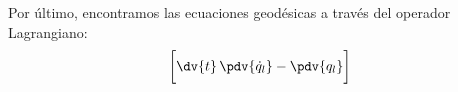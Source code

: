 Por último, encontramos las ecuaciones geodésicas a través del operador Lagrangiano:
\begin{align*}
\bigg[ \dv{t} \, \pdv{\dot{q}_{l}} - \pdv{q_{l}} \bigg] 
\end{align*}    
